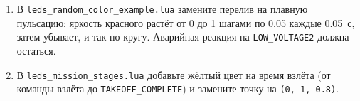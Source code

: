 \begin{taskbox}
\begin{enumerate}
  \item В \texttt{leds\_random\_color\_example.lua} замените перелив на плавную пульсацию: яркость красного растёт от 0 до 1 шагами по 0.05 каждые 0.05~с, затем убывает, и так по кругу. Аварийная реакция на \verb|LOW_VOLTAGE2| должна остаться.
  \item В \texttt{leds\_mission\_stages.lua} добавьте жёлтый цвет на время взлёта (от команды взлёта до \verb|TAKEOFF_COMPLETE|) и замените точку на \verb|(0, 1, 0.8)|.
\end{enumerate}
\end{taskbox}
